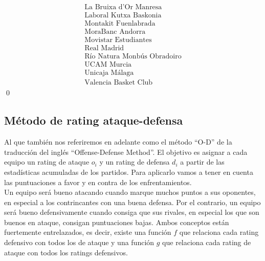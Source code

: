 \[\begin{array}{ccc}
\begin{array}{c}
	\text{La Bruixa d'Or Manresa} \\
	\text{Laboral Kutxa Baskonia} \\
	\text{Montakit Fuenlabrada} \\
	\text{MoraBanc Andorra} \\
	\text{Movistar Estudiantes} \\
	\text{Real Madrid} \\
	\text{Río Natura Monbús Obradoiro} \\
	\text{UCAM Murcia} \\
	\text{Unicaja Málaga} \\
	\text{Valencia Basket Club}
	\end{array}
	\end{array}
	\]
\qed


\subsection{Método de rating ataque-defensa}
Al que también nos referiremos en adelante como el método ``O-D'' de la traducción del inglés ``Offense-Defense Method''. El objetivo es asignar a cada equipo un rating de ataque $ o_{i} $ y un rating de defensa $d_{i}$ a partir de las estadísticas acumuladas de los partidos. Para aplicarlo vamos a tener en cuenta las puntuaciones a favor y en contra de los enfrentamientos.\\

Un equipo será bueno atacando cuando marque muchos puntos a sus oponentes, en especial a los contrincantes con una buena defensa. Por el contrario, un equipo será bueno defensivamente cuando consiga que sus rivales, en especial los que son buenos en ataque, consigan puntuaciones bajas. Ambos conceptos están fuertemente entrelazados, es decir, existe una función $f$ que relaciona cada rating defensivo con todos los de ataque y una función $g$ que relaciona cada rating de ataque con todos los ratings defensivos.\\

